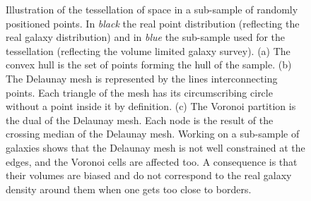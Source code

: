 \begin{figure}
\begin{minipage}{0.33\linewidth}
{    }
    \end{minipage}
    \begin{minipage}{0.33\linewidth}
    \centering
    \end{minipage}
    \caption{Illustration of the tessellation of space in a sub-sample of
        randomly positioned points. In \emph{black} the real point distribution
        (reflecting the real galaxy distribution) and in \emph{blue} the
        sub-sample used for the tessellation (reflecting the volume limited
        galaxy survey). (a) The convex hull is the set of points forming the
        hull of the sample. (b) The Delaunay mesh is represented by the lines
        interconnecting points. Each triangle of the mesh has its
        circumscribing circle without a point inside it by definition. (c) The
        Voronoi partition is the dual of the Delaunay mesh. Each node is the
        result of the crossing median of the Delaunay mesh. Working on a
        sub-sample of galaxies shows that the Delaunay mesh is not well
        constrained at the edges, and the Voronoi cells are affected too. A
        consequence is that their volumes are biased and do not correspond to
        the real galaxy density around them when one gets too close to
    borders.\label{fig:convex_delaunay_voronoi}}
\end{figure}

